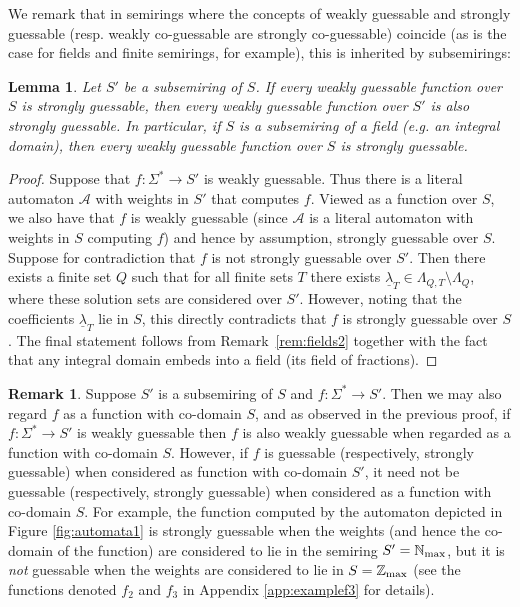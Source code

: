 \documentclass[10pt,a4paper]{amsart}
\newtheorem{lem}[thm]{Lemma}
\theoremstyle{definition}
\newtheorem{rem}[thm]{Remark}
\numberwithin{equation}{section}
\numberwithin{theorem}{section}
\begin{document}
 We remark that in semirings where the concepts of weakly guessable and strongly guessable (resp. weakly co-guessable are strongly co-guessable) coincide (as is the case for fields and finite semirings, for example), this is inherited by subsemirings:
	

		\begin{lem}
			\label{prop:subsemiring}
			Let $S'$ be a subsemiring of $S$. If every weakly guessable function over $S$ is strongly guessable, then every weakly guessable function over $S'$ is also strongly guessable.
   In particular, if $S$ is a subsemiring of a field (e.g. an integral domain), then every weakly guessable function over $S$ is strongly guessable.
		\end{lem}

	

		\begin{proof}
	Suppose that $f: \Sigma^* \rightarrow S'$ is weakly guessable. Thus there is a literal automaton $\mathcal{A}$ with weights in $S'$ that computes $f$. Viewed as a function over $S$, we also have that $f$ is weakly guessable (since $\mathcal{A}$ is a literal automaton with weights in $S$ computing $f$) and hence by assumption, strongly guessable over $S$. Suppose for contradiction that $f$ is not strongly guessable over $S'$. Then there exists a finite set $Q$ such that for all finite sets $T$ there exists $\underline{\lambda}_T \in \Lambda_{Q, T} \setminus \Lambda_Q$, where these solution sets are considered over $S'$. However, noting that the coefficients $\underline{\lambda}_T$ lie in $S$, this directly contradicts that $f$ is strongly guessable over $S$. The final statement follows from Remark~\ref{rem:fields2} together with the fact that any integral domain embeds into a field (its field of fractions).
\end{proof}	


\begin{rem}
Suppose $S'$ is a subsemiring of $S$ and $f: \Sigma^* \rightarrow S'$. Then we may also regard $f$ as a function with co-domain $S$, and as observed in the previous proof, if $f: \Sigma^* \rightarrow S'$ is weakly guessable then $f$ is also weakly guessable when regarded as a function with co-domain $S$. However, if $f$ is guessable (respectively, strongly guessable) when considered as function with co-domain $S'$, it need not be guessable (respectively, strongly guessable) when considered as a function with co-domain $S$. For example, the function computed by the automaton depicted in Figure \ref{fig:automata1} is strongly guessable when the weights (and hence the co-domain of the function) are considered to lie in the semiring $S'=\mathbb{N}_{\rm max}$, but it is \emph{not} guessable when the weights are considered to lie in $S=\mathbb{Z}_{\rm max}$ (see the functions denoted $f_2$ and $f_3$ in Appendix \ref{app:examplef3} for details). 
\end{rem}
\end{document}
